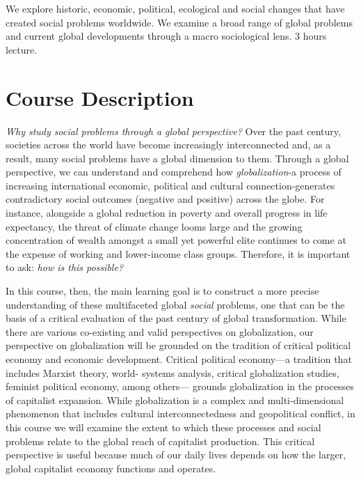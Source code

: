 \documentclass[11pt,]{article}
\begin{document}
We explore historic, economic, political, ecological and social changes
that have created social problems worldwide. We examine a broad range of
global problems and current global developments through a macro
sociological lens. 3 hours lecture.

\hypertarget{course-description}{%
\section{Course Description}\label{course-description}}

\emph{Why study social problems through a global perspective?} Over the
past century, societies across the world have become increasingly
interconnected and, as a result, many social problems have a global
dimension to them. Through a global perspective, we can understand and
comprehend how \emph{globalization}-a process of increasing
international economic, political and cultural connection-generates
contradictory social outcomes (negative and positive) across the globe.
For instance, alongside a global reduction in poverty and overall
progress in life expectancy, the threat of climate change looms large
and the growing concentration of wealth amongst a small yet powerful
elite continues to come at the expense of working and lower-income class
groups. Therefore, it is important to ask: \emph{how is this possible?}

In this course, then, the main learning goal is to construct a more
precise understanding of these multifaceted global \emph{social}
problems, one that can be the basis of a critical evaluation of the past
century of global transformation. While there are various co-existing
and valid perspectives on globalization, our perspective on
globalization will be grounded on the tradition of critical political
economy and economic development. Critical political economy---a
tradition that includes Marxist theory, world- systems analysis,
critical globalization studies, feminist political economy, among
others--- grounds globalization in the processes of capitalist
expansion. While globalization is a complex and multi-dimensional
phenomenon that includes cultural interconnectedness and geopolitical
conflict, in this course we will examine the extent to which these
processes and social problems relate to the global reach of capitalist
production. This critical perspective is useful because much of our
daily lives depends on how the larger, global capitalist economy
functions and operates.
\end{document}
